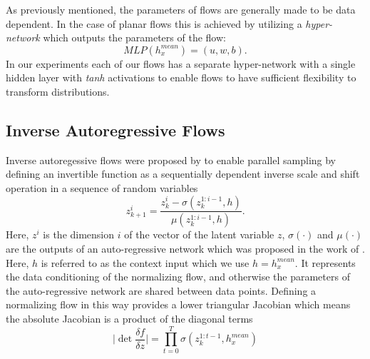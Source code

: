 

As previously mentioned, the parameters of flows are generally made to be data dependent. In the case of planar flows this is achieved by utilizing a \textit{hyper-network} \cite{ha2016hypernets} which outputs the parameters of the flow:
 \begin{equation}
 MLP(h^{mean}_{x}) = (u, w, b).
 \end{equation}
In our experiments each of our flows has a separate hyper-network with a single hidden layer with \textit{tanh} activations to enable flows to have sufficient flexibility to transform distributions.
 
\subsection{Inverse Autoregressive Flows}
Inverse autoregessive flows were proposed by \citet{kingma2016IAF} to enable parallel sampling by defining an invertible function as a sequentially dependent  inverse scale and shift  operation in a sequence of random variables
\begin{equation}
z_{k+1}^{i} = \frac{z_{k}^{i} - \sigma(z_{k}^{1:i-1}, h)}{\mu(z_{k}^{1:i-1}, h)}.
\end{equation}
Here, $z^{i}$ is the dimension $i$ of the vector of the latent variable $z$, $\sigma(\cdot)$ and $\mu(\cdot)$ are the outputs of an auto-regressive network which was proposed in the work of \citet{MADE2015germain}. Here, $h$ is referred to as the context input which we use $h= h^{mean}_{x}$. It represents the data conditioning of the normalizing flow, and otherwise the parameters of the auto-regressive network are shared between data points. Defining a normalizing flow in this way provides a lower triangular Jacobian which means the absolute Jacobian is a product of the diagonal terms 
\begin{equation}
\bigg| \det \frac{\delta f}{\delta z} \bigg| = \prod_{t=0}^{T} \sigma(z_{k}^{1:t-1}, h^{mean}_{x})
\end{equation}

